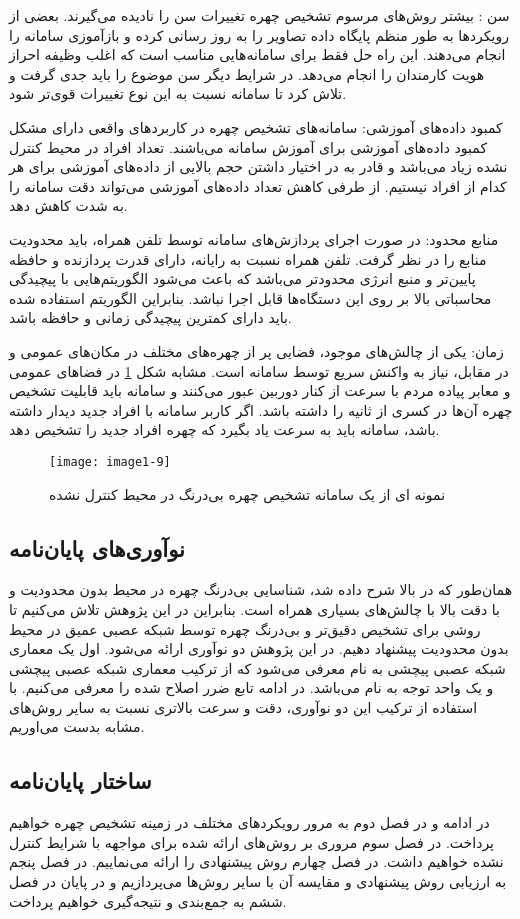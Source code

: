 \noindent
سن : بیشتر روش‌های مرسوم تشخیص چهره تغییرات سن را نادیده می‌گیرند. بعضی از رویکردها به طور منظم پایگاه داده تصاویر را به روز رسانی کرده و بازآموزی سامانه را انجام می‌دهند. این راه حل فقط برای سامانه‌هایی مناسب است که اغلب وظیفه احراز هویت کارمندان را انجام می‌دهد. در شرایط دیگر سن موضوع را باید جدی گرفت و تلاش کرد تا سامانه نسبت به این نوع تغییرات قوی‌تر شود.

\noindent
کمبود داده‌های آموزشی: سامانه‌های تشخیص چهره در کاربردهای واقعی دارای مشکل کمبود داده‌های آموزشی برای آموزش سامانه می‌باشند. تعداد افراد در محیط کنترل نشده زیاد می‌باشد و قادر به در اختیار داشتن حجم بالایی از داده‌های آموزشی برای هر کدام از افراد نیستیم. از طرفی کاهش تعداد داده‌های آموزشی می‌تواند دقت سامانه را به شدت کاهش دهد. 

\noindent
منابع محدود: در صورت اجرای پردازش‌های سامانه توسط تلفن همراه، باید محدودیت منابع را در نظر گرفت. تلفن همراه نسبت به رایانه، دارای قدرت پردازنده و حافظه پایین‌تر و منبع انرژی محدودتر می‌باشد که باعث می‌شود الگوریتم‌هایی با پیچیدگی محاسباتی بالا بر روی این دستگاه‌ها قابل اجرا نباشد. بنابراین الگوریتم استفاده شده باید دارای کمترین پیچیدگی زمانی و حافظه باشد.

\noindent
زمان: یکی از چالش‌های موجود، فضایی پر از چهره‌های مختلف در مکان‌های عمومی و در مقابل، نیاز به واکنش سریع توسط سامانه است. مشابه شکل \ref{image1-9} در فضاهای عمومی و معابر پیاده مردم با سرعت از کنار دوربین عبور می‌کنند و سامانه باید قابلیت تشخیص چهره آن‌ها در کسری از ثانیه را داشته باشد. اگر کاربر سامانه با افراد جدید دیدار داشته باشد، سامانه باید به سرعت یاد بگیرد که چهره افراد جدید را تشخیص دهد. 

\begin{figure}[!h]
\centering
\texttt{[image: image1-9]}
\caption{نمونه ای از یک سامانه تشخیص چهره بی‌درنگ در محیط کنترل نشده \cite{CHAUDHRY2017168}}
\label{image1-9}
\end{figure}

\subsection{نوآوری‌های پایان‌نامه}
 همان‌طور که در بالا شرح داده شد، شناسایی بی‌درنگ چهره در محیط بدون محدودیت و با دقت بالا با چالش‌های بسیاری همراه است. بنابراین در این پژوهش تلاش می‌کنیم تا روشی برای تشخیص دقیق‌تر و بی‌درنگ چهره توسط شبکه عصبی عمیق در محیط بدون محدودیت پیشنهاد دهیم. در این پژوهش دو نوآوری ارائه می‌شود. اول یک معماری شبکه عصبی پیچشی به نام  معرفی می‌شود که از ترکیب معماری شبکه عصبی پیچشی  و یک واحد توجه به نام   می‌باشد. در ادامه تابع ضرر  اصلاح شده را معرفی می‌کنیم. با استفاده از ترکیب این دو نوآوری، دقت و سرعت بالاتری نسبت به سایر روش‌های مشابه بدست می‌اوریم.  

\subsection{ساختار پایان‌نامه}
در ادامه و در فصل دوم به مرور رویکردهای مختلف در زمینه تشخیص چهره خواهیم پرداخت. در فصل سوم مروری بر روش‌های ارائه شده برای مواجهه با شرایط کنترل نشده خواهیم داشت. در فصل چهارم روش پیشنهادی را ارائه می‌نماییم. در فصل پنجم به ارزیابی روش پیشنهادی و مقایسه آن با سایر روش‌ها می‌پردازیم و در پایان در فصل ششم به جمع‌بندی و نتیجه‌گیری خواهیم پرداخت.
